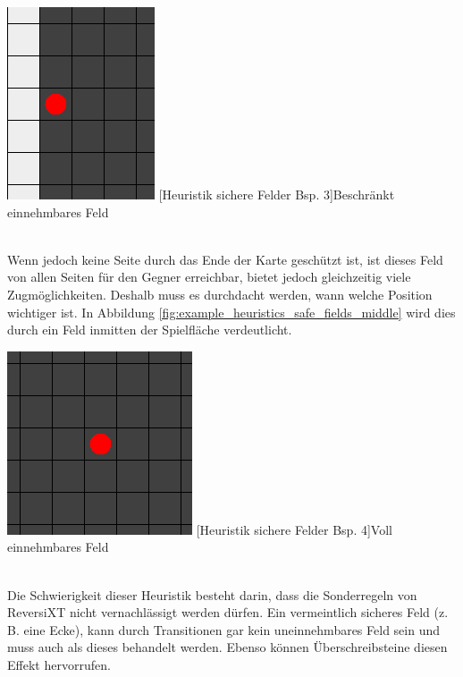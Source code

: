 \documentclass[12pt,a4paper,bibliography=totocnumbered,listof=totocnumbered]{article}
\begin{document}
\vspace{1em}
\begin{minipage}{\linewidth}
	\centering
	\includegraphics[width=0.3\linewidth]{pics/heuristics_safe_fields_outer_side.png}
	[Heuristik sichere Felder Bsp. 3]{Beschränkt einnehmbares Feld}
	\label{fig:example_heuristics_safe_fields_outer_side}
\end{minipage}
\\

Wenn jedoch keine Seite durch das Ende der Karte geschützt ist, ist dieses Feld von allen Seiten für den Gegner erreichbar, bietet jedoch gleichzeitig viele Zugmöglichkeiten. Deshalb muss es durchdacht werden, wann welche Position wichtiger ist. In Abbildung \ref{fig:example_heuristics_safe_fields_middle} wird dies durch ein Feld inmitten der Spielfläche verdeutlicht.

\vspace{1em}
\begin{minipage}{\linewidth}
	\centering
	\includegraphics[width=0.3\linewidth]{pics/heuristics_safe_fields_middle.png}
	[Heuristik sichere Felder Bsp. 4]{Voll einnehmbares Feld}
	\label{fig:example_heuristics_safe_fields_middle}
\end{minipage}
\\

Die Schwierigkeit dieser Heuristik besteht darin, dass die Sonderregeln von ReversiXT nicht vernachlässigt werden dürfen. Ein vermeintlich sicheres Feld (z. B. eine Ecke), kann durch Transitionen gar kein uneinnehmbares Feld sein und muss auch als dieses behandelt werden. Ebenso können Überschreibsteine diesen Effekt hervorrufen.
\end{document}

